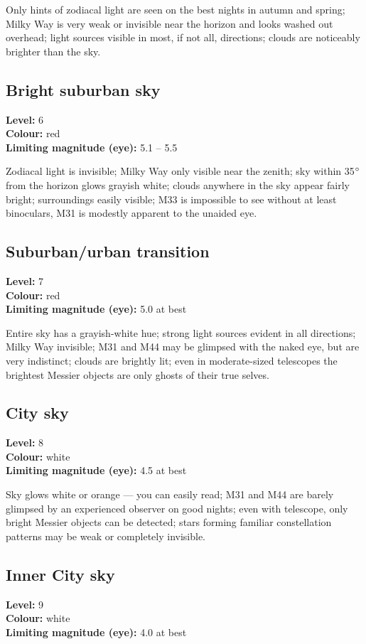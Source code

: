 Only hints of zodiacal light are seen on the best nights in autumn and spring; Milky Way is very weak or invisible near the horizon and looks washed out overhead; light sources visible in most, if not all, directions; clouds are noticeably brighter than the sky.

\subsection{Bright suburban sky}
\textbf{Level:} 6 \\
\textbf{Colour:} red \\
\textbf{Limiting magnitude (eye):} 5.1 -- 5.5

Zodiacal light is invisible; Milky Way only visible near the zenith; sky within 35$\degree$ from the horizon glows grayish white; clouds anywhere in the sky appear fairly bright; surroundings easily visible; M33 is impossible to see
without at least binoculars, M31 is modestly apparent to the unaided eye.

\subsection{Suburban/urban transition}
\textbf{Level:} 7 \\
\textbf{Colour:} red \\
\textbf{Limiting magnitude (eye):} 5.0 at best

Entire sky has a grayish-white hue; strong light sources evident in all directions; Milky Way invisible; M31 and M44 may be glimpsed with the naked eye, but are very indistinct; clouds are brightly lit; even in moderate-sized telescopes the brightest Messier objects are only ghosts of their true selves.

\subsection{City sky}
\textbf{Level:} 8 \\
\textbf{Colour:} white \\
\textbf{Limiting magnitude (eye):} 4.5 at best

Sky glows white or orange --- you can easily read; M31 and M44 are barely glimpsed by an experienced observer on good nights; even with telescope, only bright Messier objects can be detected; stars forming familiar constellation patterns may be weak or completely invisible.

\subsection{Inner City sky}
\textbf{Level:} 9 \\
\textbf{Colour:} white \\
\textbf{Limiting magnitude (eye):} 4.0 at best

